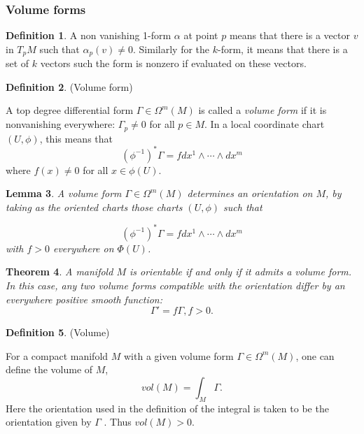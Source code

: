 \documentclass{article}
\newtheorem{theorem}{Theorem}[section]
\newtheorem{lemma}[theorem]{Lemma}
\theoremstyle{definition}
\newtheorem{defn}[theorem]{Definition}
\newenvironment{definition}
  {\vspace{8pt}\begin{mdframed}[backgroundcolor=blueish]\begin{defn}}
  {\end{defn}\end{mdframed}\vspace{4pt}}
\begin{document}
\subsubsection{Volume forms}

\begin{definition}

A non vanishing 1-form $\alpha$ at point $p$ means that there is a vector $v$ in $T_pM$ such that $\alpha_p(v)\neq 0$. Similarly for the $k$-form, it means that there is a set of $k$ vectors such the form is nonzero if evaluated on these vectors.
\end{definition}

\begin{definition} (Volume form)

A top degree differential form $\Gamma \in \Omega^m(M)$ is called a \textit{volume form} if it is nonvanishing  everywhere: $\Gamma_p \neq 0$ for all $p \in M$. In a local coordinate chart $(U,\phi)$, this means that 
\[ (\phi^{-1} )^*\Gamma = f dx^1 \wedge \cdots \wedge dx^m 
\]
where $f(x) \neq 0$ for all $x \in  \phi(U)$.

\end{definition}


\begin{lemma}

A volume form $\Gamma \in \Omega^m(M)$ determines an orientation on $M$, by taking as the oriented charts those charts $(U,\phi)$ such that 

\[
    (\phi^{-1})^*\Gamma = f dx^1 \wedge \cdots \wedge dx^m
\]
with $f > 0$ everywhere on $\Phi(U)$.
\end{lemma}


\begin{theorem}

A manifold $M$ is orientable if and only if it admits a volume form. In this case, any two volume forms compatible with the orientation differ by an everywhere positive smooth function: 
\[
    \Gamma' = f \Gamma , f > 0.
\]

\end{theorem}

\begin{definition} (Volume)

For a compact manifold $M$ with a given volume form $\Gamma \in \Omega^m(M)$, one can define the volume of $M$, 
\[
vol(M) = \int_M \Gamma.
\]
Here the orientation used in the definition of the integral is taken to be the orientation given by $\Gamma$ . Thus $vol(M) > 0$.
\end{definition}
\end{document}
